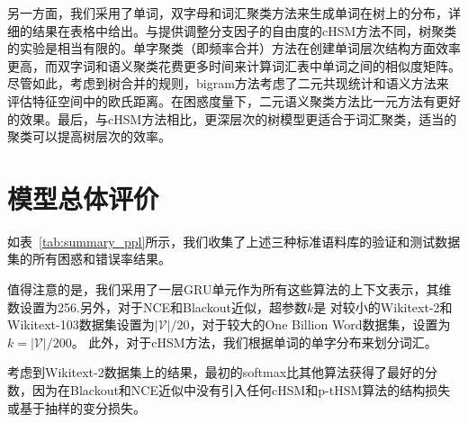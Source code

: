 另一方面，我们采用了单词，双字母和词汇聚类方法来生成单词在树上的分布，详细的结果在表格中给出。与提供调整分支因子的自由度的cHSM方法不同，树聚类的实验是相当有限的。单字聚类（即频率合并）方法在创建单词层次结构方面效率更高，而双字词和语义聚类花费更多时间来计算词汇表中单词之间的相似度矩阵。尽管如此，考虑到树合并的规则，bigram方法考虑了二元共现统计和语义方法来评估特征空间中的欧氏距离。在困惑度量下，二元语义聚类方法比一元方法有更好的效果。最后，与cHSM方法相比，更深层次的树模型更适合于词汇聚类，适当的聚类可以提高树层次的效率。

\section{模型总体评价}
如表~\ref{tab:summary_ppl}所示，我们收集了上述三种标准语料库的验证和测试数据集的所有困惑和错误率结果。

值得注意的是，我们采用了一层GRU单元作为所有这些算法的上下文表示，其维数设置为256.另外，对于NCE和Blackout近似，超参数$ k $是 对较小的Wikitext-2和Wikitext-103数据集设置为$\mathcal{|V|}/20 $，对于较大的One Billion Word数据集，设置为$ k = | \mathcal{V} | / 200 $。 此外，对于cHSM方法，我们根据单词的单字分布来划分词汇。

考虑到Wikitext-2数据集上的结果，最初的softmax比其他算法获得了最好的分数，因为在Blackout和NCE近似中没有引入任何cHSM和p-tHSM算法的结构损失或基于抽样的变分损失。

